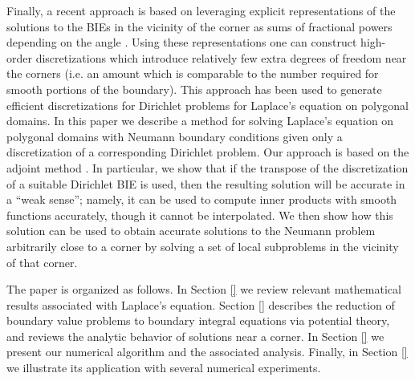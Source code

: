  Finally, a recent approach is based on leveraging explicit representations of the solutions to the BIEs in the vicinity of the corner as sums of fractional powers depending on the angle \cite{}. Using these representations one can construct high-order discretizations which introduce relatively few extra degrees of freedom near the corners (i.e. an amount which is comparable to the number required for smooth portions of the boundary). This approach has been used to generate efficient discretizations for Dirichlet problems for Laplace's equation on polygonal domains\cite{}. In this paper we describe a method for solving Laplace's equation on polygonal domains with Neumann boundary conditions given only a discretization of a corresponding Dirichlet problem. Our approach is based on the adjoint method \cite{}. In particular, we show that if the transpose of the discretization of a suitable Dirichlet BIE is used, then the resulting solution will be accurate in a ``weak sense''; namely, it can be used to compute inner products with smooth functions accurately, though it cannot be interpolated. We then show how this solution can be used to obtain accurate solutions to the Neumann problem arbitrarily close to a corner by solving a set of local subproblems in the vicinity of that corner.
 
 The paper is organized as follows. In Section \ref{} we review relevant mathematical results associated with Laplace's equation. Section \ref{} describes the reduction of boundary value problems to boundary integral equations via potential theory, and reviews the analytic behavior of solutions near a corner. In Section \ref{} we present our numerical algorithm and the associated analysis. Finally, in Section \ref{} we illustrate its application with several numerical experiments.